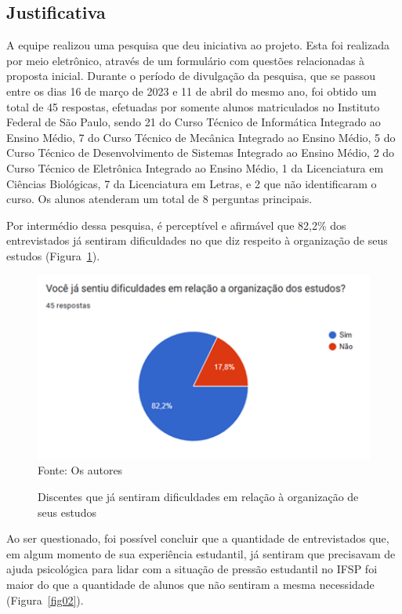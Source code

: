 \documentclass[12pt,a4paper]{article}
\begin{document}
\subsection{Justificativa}

A equipe realizou uma pesquisa que deu iniciativa ao projeto. Esta foi realizada por meio eletrônico, através de um formulário com questões relacionadas à proposta inicial. Durante o período de divulgação da pesquisa, que se passou entre os dias 16 de março de 2023 e 11 de abril do mesmo ano, foi obtido um total de 45 respostas, efetuadas por somente alunos matriculados no Instituto Federal de São Paulo, sendo 21 do Curso Técnico de Informática Integrado ao Ensino Médio, 7 do Curso Técnico de Mecânica Integrado ao Ensino Médio, 5 do Curso Técnico de Desenvolvimento de Sistemas Integrado ao Ensino Médio, 2 do Curso Técnico de Eletrônica Integrado ao Ensino Médio, 1 da Licenciatura em Ciências Biológicas, 7 da Licenciatura em Letras, e 2 que não identificaram o curso. Os alunos atenderam um total de 8 perguntas principais. 

Por intermédio dessa pesquisa, é perceptível e afirmável que 82,2\% dos entrevistados já sentiram dificuldades no que diz respeito à organização de seus estudos (Figura~\ref{fig01}).

\begin{figure}[H]
    \centering
    \caption{Discentes que já sentiram dificuldades em relação à organização de seus estudos}
    \includegraphics[width=12cm]{img1.png}
    Fonte: Os autores
    \label{fig01}
\end{figure}

Ao ser questionado, foi possível concluir que a quantidade de entrevistados que, em algum momento de sua experiência estudantil, já sentiram que precisavam de ajuda psicológica para lidar com a situação de pressão estudantil no \ac{IFSP} foi maior do que a quantidade de alunos que não sentiram a mesma necessidade (Figura~\ref{fig02}). 
\end{document}
